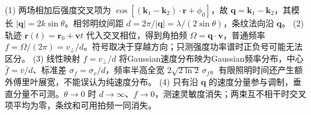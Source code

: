 (1) 两场相加后强度交叉项为 \(\cos[(\mathbf k_1-\mathbf k_2)\cdot\mathbf r+\phi_0]\)，故 \(\mathbf q=\mathbf k_1-\mathbf k_2\)，其模长 \(|\mathbf q|=2k\sin\theta\)。相邻明纹间距 \(d=2\pi/|\mathbf q|=\lambda/(2\sin\theta)\)，条纹法向沿 \(\mathbf q\)。
(2) 轨迹 \(\mathbf r(t)=\mathbf r_0+\mathbf vt\) 代入交叉相位，得到角拍频 \(\Omega=\mathbf q\cdot\mathbf v\)，普通频率 \(f=\Omega/(2\pi)=v_\perp/d\)。符号取决于穿越方向；只测强度功率谱时正负号可能无法区分。
(3) 线性映射 \(f=v_\perp/d\) 将Gaussian速度分布映为Gaussian频率分布，中心 \(\bar f=\bar v/d\)、标准差 \(\sigma_f=\sigma_v/d\)，频率半高全宽 \(2\sqrt{2\ln2}\,\sigma_f\)。有限照明时间还产生额外傅里叶展宽，不能误认为纯速度分布。
(4) 只有沿 \(\mathbf q\) 的速度分量参与调制，垂直分量不可测。\(\theta\to0\) 时 \(d\to\infty\)、\(f\to0\)，测速灵敏度消失；两束互不相干时交叉项平均为零，条纹和可用拍频一同消失。
